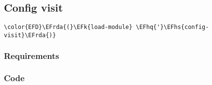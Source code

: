 \documentclass[a4wide,10pt]{article}
\newcommand{\EFk}[1]{\textcolor{EFk}{#1}} %
\newcommand{\EFhq}[1]{\textcolor{EFhq}{#1}} %
\newcommand{\EFhs}[1]{\textcolor{EFhs}{#1}} %
\newcommand{\EFrda}[1]{\textcolor{EFrda}{#1}} %
\begin{document}
\subsection{Config visit}
\label{sec:org7b105c5}
\begin{Code}
\begin{Verbatim}
\color{EFD}\EFrda{(}\EFk{load-module} \EFhq{'}\EFhs{config-visit}\EFrda{)}
\end{Verbatim}
\end{Code}
\subsubsection{Requirements}
\label{sec:org08a2ad2}
\subsubsection{Code}
\label{sec:org8f88c9c}
\end{document}
